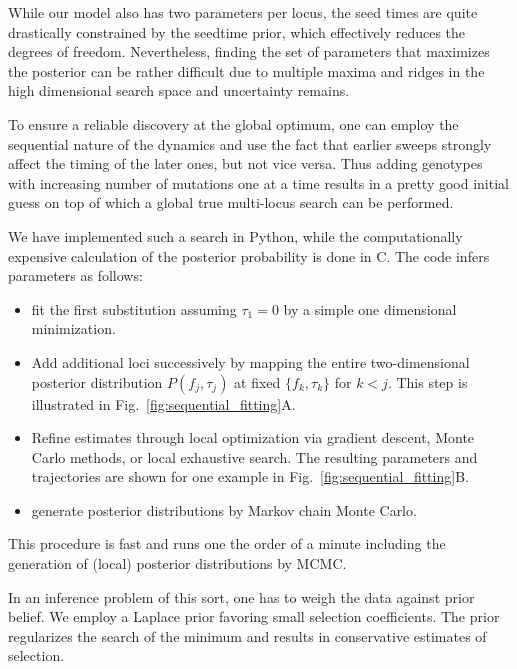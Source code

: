\documentclass[rmp,twocolumn]{revtex4}
\newcommand{\FIG}[1]{Fig.~\ref{fig:#1}}
\newcommand{\fcoeff}{f}
\begin{document}
While our model also has two parameters per locus, the seed times are quite
drastically constrained by the seedtime prior, which effectively reduces the
degrees of freedom.
Nevertheless, finding the set of parameters that maximizes the posterior can be
rather difficult due to multiple maxima and ridges in the high dimensional
search space and uncertainty remains.

To ensure a reliable discovery at the global optimum, one can employ the
sequential nature of the dynamics and use the fact that earlier sweeps
strongly affect the timing of the later ones, but not vice versa. Thus adding
genotypes with increasing number of mutations one at a time 
results in a pretty good initial guess on top of which a global true multi-locus search can be
performed. 

We have implemented such a search in Python, while the computationally expensive
calculation of the posterior probability is done in C. The code infers
parameters as follows:
\begin{itemize}
  \item fit the first substitution assuming $\tau_1=0$ by a
  simple one dimensional minimization. 
  \item Add additional loci successively by mapping the entire two-dimensional
  posterior distribution $P(\fcoeff_j,\tau_j)$ at fixed $\{\fcoeff_k,\tau_k\}$
  for $k<j$. This step is illustrated in \FIG{sequential_fitting}A.
  \item Refine estimates through local optimization via gradient descent, Monte
  Carlo methods, or local exhaustive search. The resulting parameters and
  trajectories are shown for one example in \FIG{sequential_fitting}B.
  \item generate posterior distributions by Markov chain Monte Carlo. 
\end{itemize}
This procedure is fast and runs one the order of a minute including the
generation of (local) posterior distributions by MCMC.

In an inference problem of this sort, one has to weigh the data against
prior belief. We employ a Laplace prior favoring small selection coefficients.
The prior regularizes the search of the minimum and results in conservative
estimates of selection.
\end{document}
